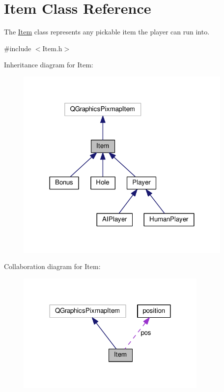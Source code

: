 \hypertarget{class_item}{}\section{Item Class Reference}
\label{class_item}


The \hyperlink{class_item}{Item} class represents any pickable item the player can run into.  




{\ttfamily \#include $<$Item.\+h$>$}



Inheritance diagram for Item\+:\nopagebreak
\begin{figure}[H]
\begin{center}
\leavevmode
\includegraphics[width=300pt]{class_item__inherit__graph}
\end{center}
\end{figure}


Collaboration diagram for Item\+:\nopagebreak
\begin{figure}[H]
\begin{center}
\leavevmode
\includegraphics[width=264pt]{class_item__coll__graph}
\end{center}
\end{figure}
